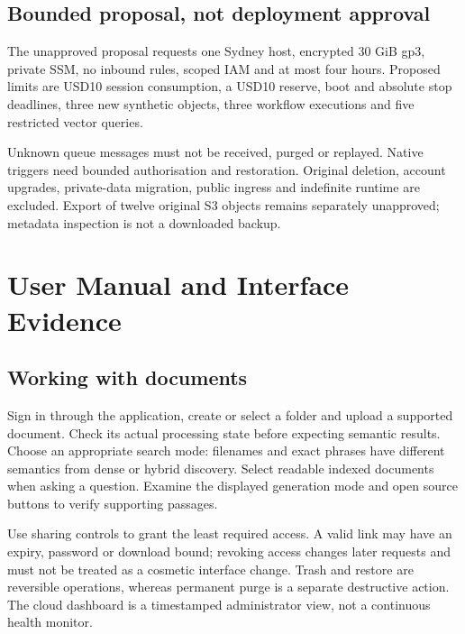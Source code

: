 \section{Bounded proposal, not deployment approval}
The unapproved proposal requests one Sydney host, encrypted 30 GiB gp3, private SSM, no inbound rules, scoped IAM and at most four hours. Proposed limits are USD10 session consumption, a USD10 reserve, boot and absolute stop deadlines, three new synthetic objects, three workflow executions and five restricted vector queries.

Unknown queue messages must not be received, purged or replayed. Native triggers need bounded authorisation and restoration. Original deletion, account upgrades, private-data migration, public ingress and indefinite runtime are excluded. Export of twelve original S3 objects remains separately unapproved; metadata inspection is not a downloaded backup.
\small
\chapter{User Manual and Interface Evidence}
\section{Working with documents}
Sign in through the application, create or select a folder and upload a supported document. Check its actual processing state before expecting semantic results. Choose an appropriate search mode: filenames and exact phrases have different semantics from dense or hybrid discovery. Select readable indexed documents when asking a question. Examine the displayed generation mode and open source buttons to verify supporting passages.

Use sharing controls to grant the least required access. A valid link may have an expiry, password or download bound; revoking access changes later requests and must not be treated as a cosmetic interface change. Trash and restore are reversible operations, whereas permanent purge is a separate destructive action. The cloud dashboard is a timestamped administrator view, not a continuous health monitor.
\FloatBarrier
